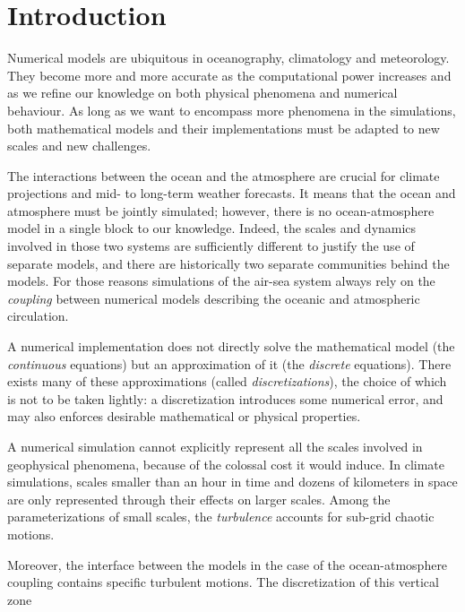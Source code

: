 \chapter*{Introduction}
\label{ch:introduction}
Numerical models are ubiquitous in oceanography, climatology and
meteorology. They become more and more accurate as the
computational power increases and as we refine our knowledge on
both physical phenomena and numerical behaviour.
As long as we want to encompass more phenomena in the simulations,
both mathematical models and their implementations must be
adapted to new scales and new challenges.
\par %
The interactions between the ocean and the atmosphere are crucial
for climate projections and mid- to long-term weather forecasts.
It means that the ocean and atmosphere must be jointly simulated;
however, there is no ocean-atmosphere model in a single
block to our knowledge.
Indeed, the scales and dynamics involved in those two systems are
sufficiently different to justify the use of separate models,
and there are historically two separate communities behind the
models. For those reasons simulations of the air-sea system
always rely on the \textit{coupling} between numerical models describing
the oceanic and atmospheric circulation.
\par %
A numerical implementation does not directly solve the mathematical
model (the \textit{continuous} equations) but an approximation of it
(the \textit{discrete} equations). There exists many of these
approximations (called \textit{discretizations}), the choice of which
is not to be taken lightly: a discretization introduces some
numerical error, and may also enforces desirable mathematical
or physical properties.
\par
A numerical simulation cannot explicitly represent all the
scales involved in geophysical phenomena, because of the
colossal cost it would induce. In climate simulations,
scales smaller than an hour in time
and dozens of kilometers in space are only represented
through their effects on larger scales.
Among the parameterizations of small scales, the \textit{turbulence}
accounts for sub-grid chaotic motions.
\par %
Moreover, the interface between the models in the case of
the ocean-atmosphere coupling contains
specific turbulent motions. The discretization of this vertical zone

